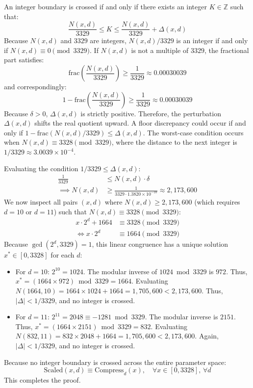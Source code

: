 \begin{IEEEproof}
An integer boundary is crossed if and only if there exists an integer $K \in \mathbb{Z}$ such that:
\begin{equation}
\frac{N(x, d)}{3329} \le K \le \frac{N(x, d)}{3329} + \Delta(x, d)
\end{equation}
Because $N(x, d)$ and $3329$ are integers, $N(x, d) / 3329$ is an integer if and only if $N(x, d) \equiv 0 \pmod{3329}$. If $N(x, d)$ is not a multiple of $3329$, the fractional part satisfies:
\begin{equation}
\text{frac}\left(\frac{N(x, d)}{3329}\right) \ge \frac{1}{3329} \approx 0.00030039
\end{equation}
and correspondingly:
\begin{equation}
1 - \text{frac}\left(\frac{N(x, d)}{3329}\right) \ge \frac{1}{3329} \approx 0.00030039
\end{equation}
Because $\delta > 0$, $\Delta(x, d)$ is strictly positive. Therefore, the perturbation $\Delta(x, d)$ shifts the real quotient upward. A floor discrepancy could occur if and only if $1 - \text{frac}(N(x, d)/3329) \le \Delta(x, d)$. The worst-case condition occurs when $N(x, d) \equiv 3328 \pmod{3329}$, where the distance to the next integer is $1/3329 \approx 3.0039 \times 10^{-4}$.

Evaluating the condition $1/3329 \le \Delta(x, d)$:
\begin{align}
\frac{1}{3329} &\le N(x, d) \cdot \delta \nonumber \\
\implies N(x, d) &\ge \frac{1}{3329 \cdot 1.3820 \times 10^{-10}} \approx 2,173,600
\end{align}
We now inspect all pairs $(x, d)$ where $N(x, d) \ge 2,173,600$ (which requires $d = 10$ or $d = 11$) such that $N(x, d) \equiv 3328 \pmod{3329}$:
\begin{align}
x \cdot 2^d + 1664 &\equiv 3328 \pmod{3329} \nonumber \\
\iff x \cdot 2^d &\equiv 1664 \pmod{3329}
\end{align}
Because $\gcd(2^d, 3329) = 1$, this linear congruence has a unique solution $x^* \in [0, 3328]$ for each $d$:
\begin{itemize}
    \item For $d = 10$: $2^{10} = 1024$. The modular inverse of $1024 \bmod 3329$ is $972$. Thus, $x^* = (1664 \times 972) \bmod 3329 = 1664$. Evaluating $N(1664, 10) = 1664 \times 1024 + 1664 = 1,705,600 < 2,173,600$. Thus, $|\Delta| < 1/3329$, and no integer is crossed.
    \item For $d = 11$: $2^{11} = 2048 \equiv -1281 \bmod 3329$. The modular inverse is $2151$. Thus, $x^* = (1664 \times 2151) \bmod 3329 = 832$. Evaluating $N(832, 11) = 832 \times 2048 + 1664 = 1,705,600 < 2,173,600$. Again, $|\Delta| < 1/3329$, and no integer is crossed.
\end{itemize}
Because no integer boundary is crossed across the entire parameter space:
\begin{equation}
\text{Scaled}(x, d) \equiv \text{Compress}_d(x), \quad \forall x \in [0, 3328], \, \forall d
\end{equation}
This completes the proof.
\end{IEEEproof}

